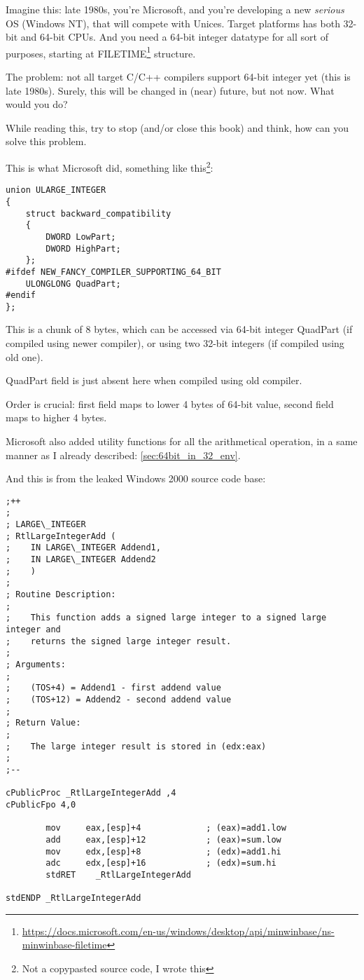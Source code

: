 \label{LargeInteger}

Imagine this: late 1980s, you're Microsoft, and you're developing a new \emph{serious} \ac{OS} (Windows NT),
that will compete with Unices.
Target platforms has both 32-bit and 64-bit CPUs.
And you need a 64-bit integer datatype for all sort of purposes, starting at
FILETIME\footnote{\url{https://docs.microsoft.com/en-us/windows/desktop/api/minwinbase/ns-minwinbase-filetime}} structure.

The problem: not all target C/C++ compilers support 64-bit integer yet (this is late 1980s).
Surely, this will be changed in (near) future, but not now.
What would you do?

While reading this, try to stop (and/or close this book) and think, how can you solve this problem.

\clearpage

This is what Microsoft did, something like this\footnote{Not a copypasted source code, I wrote this}:

\begin{lstlisting}
union ULARGE_INTEGER
{
    struct backward_compatibility
    {
        DWORD LowPart;
        DWORD HighPart;
    };
#ifdef NEW_FANCY_COMPILER_SUPPORTING_64_BIT
    ULONGLONG QuadPart;
#endif
};
\end{lstlisting}

This is a chunk of 8 bytes, which can be accessed via 64-bit integer QuadPart (if compiled using newer compiler),
or using two 32-bit integers (if compiled using old one).

QuadPart field is just absent here when compiled using old compiler.

Order is crucial: first field maps to lower 4 bytes of 64-bit value, second field maps to higher 4 bytes.

Microsoft also added utility functions for all the arithmetical operation, in a same manner as I already described:
\ref{sec:64bit_in_32_env}.

And this is from the leaked Windows 2000 source code base:

\begin{lstlisting}[style=customasmx86,caption=i386 arch]
;++
;
; LARGE\_INTEGER
; RtlLargeIntegerAdd (
;    IN LARGE\_INTEGER Addend1,
;    IN LARGE\_INTEGER Addend2
;    )
;
; Routine Description:
;
;    This function adds a signed large integer to a signed large integer and
;    returns the signed large integer result.
;
; Arguments:
;
;    (TOS+4) = Addend1 - first addend value
;    (TOS+12) = Addend2 - second addend value
;
; Return Value:
;
;    The large integer result is stored in (edx:eax)
;
;--

cPublicProc _RtlLargeIntegerAdd ,4
cPublicFpo 4,0

        mov     eax,[esp]+4             ; (eax)=add1.low
        add     eax,[esp]+12            ; (eax)=sum.low
        mov     edx,[esp]+8             ; (edx)=add1.hi
        adc     edx,[esp]+16            ; (edx)=sum.hi
        stdRET    _RtlLargeIntegerAdd

stdENDP _RtlLargeIntegerAdd
\end{lstlisting}

